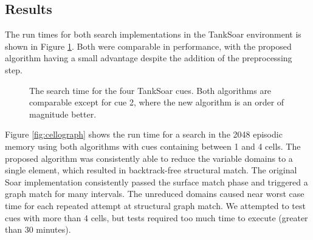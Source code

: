 \documentclass[envcountsame]{llncs}
\begin{document}
  \subsection{Results}

 The run times for both search implementations in the TankSoar environment is shown in Figure \ref{fig:runtime_comparison1}.
 Both were comparable in performance, with the proposed algorithm having a small advantage despite the addition of the preprocessing step.
  \begin{figure}
    \caption{The search time for the four TankSoar cues. Both algorithms are comparable except for cue 2, where the new algorithm is an order of magnitude better.}
    \label{fig:runtime_comparison1}
  \end{figure}
 Figure \ref{fig:cellograph} shows the run time for a search in the 2048 episodic memory using both
  algorithms with cues containing between 1 and 4 cells.
  The proposed algorithm was consistently able to reduce the variable domains to a single element, which resulted in backtrack-free structural match.
  The original Soar implementation consistently passed the surface match phase and triggered a graph match for many intervals.
  The unreduced domains caused near worst case time for each repeated attempt at structural graph match.
  We attempted to test cues with more than 4 cells, but tests required too much time to execute (greater than 30 minutes).
\end{document}
